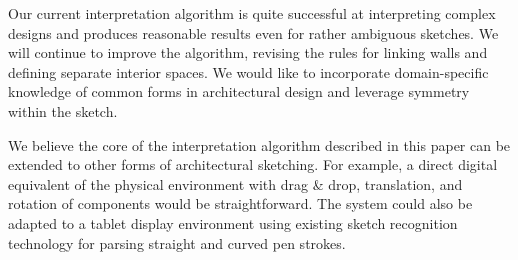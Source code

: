 Our current interpretation algorithm is quite successful at
interpreting complex designs and produces reasonable results even for
rather ambiguous sketches.  We will continue to improve the algorithm,
revising the rules for linking walls and defining separate interior
spaces.  We would like to incorporate domain-specific knowledge of
common forms in architectural design and leverage symmetry within the
sketch.  %

We believe the core of the interpretation algorithm described in this
paper can be extended to other forms of architectural sketching.  For
example, a direct digital equivalent of the physical environment with
drag \& drop, translation, and rotation of components would be
straightforward.  The system could also be adapted to a tablet display
environment using existing sketch recognition technology for parsing
straight and curved pen strokes.





